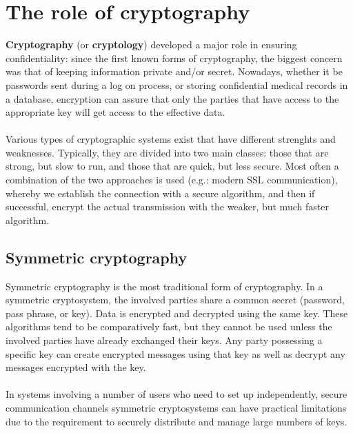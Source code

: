 \documentclass[Lau,binding=0.6cm,oneside]{sapthesis}
\begin{document}
\section{The role of cryptography}
\textbf{Cryptography} (or \textbf{cryptology}) developed a major role in ensuring confidentiality: since the first known forms of cryptography, the biggest concern was that of keeping information private and/or secret. Nowadays, whether it be passwords sent during a log on process, or storing confidential medical records in a database, encryption can assure that only the parties that have access to the appropriate key will get access to the effective data.\\\\
Various types of cryptographic systems exist that have different strenghts and weaknesses. Typically, they are divided into two main classes: those that are strong, but slow to run, and those that are quick, but less secure. Most often a combination of the two approaches is used (e.g.: modern SSL communication), whereby we establish the connection with a secure algorithm, and then if successful, encrypt the actual transmission with the weaker, but much faster algorithm.

\subsection{Symmetric cryptography}
Symmetric cryptography is the most traditional form of cryptography. In a symmetric cryptosystem, the involved parties share a common secret (password, pass phrase, or key). Data is encrypted and decrypted using the same key\supercite{symmetric}. These algorithms tend to be comparatively fast, but they cannot be used unless the involved parties have already exchanged their keys. Any party possessing a specific key can create encrypted messages using that key as well as decrypt any messages encrypted with the key.\\\\
In systems involving a number of users who need to set up independently, secure communication channels symmetric cryptosystems can have practical limitations due to the requirement to securely distribute and manage large numbers of keys.
\end{document}
